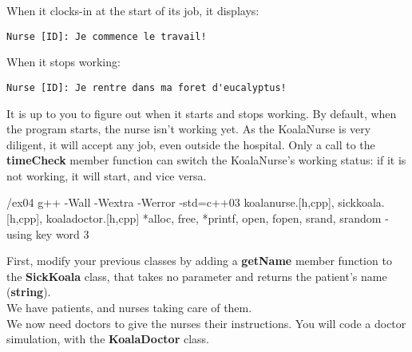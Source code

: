 \begin{itemize}
    When it clocks-in at the start of its job, it displays:
    \begin{lstlisting}
Nurse [ID]: Je commence le travail!
    \end{lstlisting}

    When it stops working:
    \begin{lstlisting}
Nurse [ID]: Je rentre dans ma foret d'eucalyptus!
    \end{lstlisting}

    It is up to you to figure out when it starts and stops working. By default,
    when the program starts, the nurse isn't working yet. As the KoalaNurse is
    very diligent, it will accept any job, even outside the hospital. Only a call
    to the \textbf{timeCheck} member function can switch the KoalaNurse's working
    status: if it is not working, it will start, and vice versa.
\end{itemize}


\newpage

\printCPPExerciseFormalities
{/ex04}
{g++ -Wall -Wextra -Werror -std=c++03}
{koalanurse.[h,cpp], sickkoala.[h,cpp], koaladoctor.[h,cpp]}
{*alloc, free, *printf, open, fopen, srand, srandom - using key word}
{3}

First, modify your previous classes by adding a \textbf{getName} member function
to the \textbf{SickKoala} class, that takes no parameter and returns the patient's
name (\textbf{string}).\\

We have patients, and nurses taking care of them.\\
We now need doctors to give the nurses their instructions. You will code a doctor
simulation, with the \textbf{KoalaDoctor} class.\\

